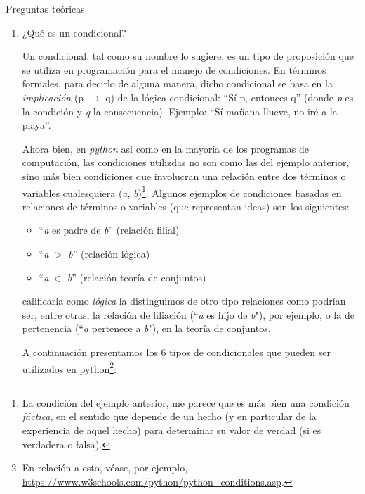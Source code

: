 \documentclass{article}
\begin{document}
\begin{center}
\LARGE{Preguntas teóricas}    \\
\end{center}

\vspace{0.5cm}

\begin{enumerate}
\item ¿Qué es un condicional?

\par\hspace{5pt} Un condicional, tal como su nombre lo sugiere, es un tipo de proposición que se utiliza en programación para el manejo de condiciones. En términos formales, para decirlo de alguna manera, dicho condicional se basa en la \emph{implicación} (p $\rightarrow$ q) de la lógica condicional: ``Sí p, entonces q'' (donde \emph{p} es la condición y \emph{q} la consecuencia). Ejemplo: ``Sí mañana llueve, no iré a la playa''.

\par \hspace{5pt} Ahora bien, en \emph{python} así como en la mayoría de los programas de computación, las condiciones utilizdas no son como las del ejemplo anterior, sino más bien condiciones que involucran una relación entre dos términos o variables cualesquiera (\emph{a}, \emph{b})\footnote
{
La condición del ejemplo anterior, me parece que es más bien una condición \emph{fáctica}, en el sentido que depende de un hecho (y en particular de la experiencia de aquel hecho) para determinar su valor de verdad (si es verdadera o falsa).
}.
Algunos ejemplos de condiciones basadas en relaciones de términos o variables (que representan ideas) son los siguientes:

\begin{itemize}
\item ``\emph{a} es padre de \emph{b}'' (relación filial)
\item ``\emph{a} $>$ \emph{b}'' (relación lógica)
\item ``\emph{a} $\in$ \emph{b}'' (relación teoría de conjuntos)
\end{itemize}

calificarla como \emph{lógica} la distinguimos de otro tipo relaciones como podrían ser, entre otras, la relación de filiación (``\emph{a} es hijo de \emph{b}"), por ejemplo, o la de pertenencia (``\emph{a} pertenece a \emph{b}"), en la teoría de conjuntos.

\par \hspace{0.5cm} A continuación presentamos los 6 tipos de condicionales que pueden ser utilizados en python\footnote
{
En relación a esto, véase, por ejemplo, \url{https://www.w3schools.com/python/python_conditions.asp}.
}:


\end{enumerate}
\end{document}

